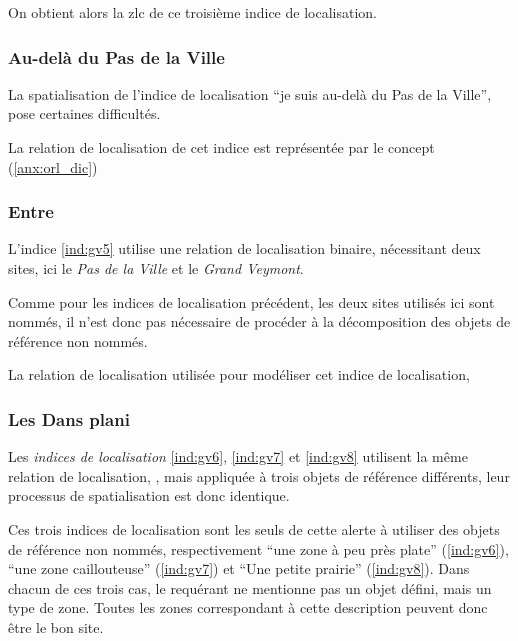 On obtient alors la \ac{zlc} de ce troisième indice de localisation.

%   




\subsubsection{Au-delà du Pas de la Ville}

La spatialisation de l'indice de localisation \enquote{je suis au-delà
  du Pas de la Ville}, pose certaines difficultés.

La relation de localisation de cet indice est représentée par le
concept 
(\autoref{anx:orl_dic})

\subsubsection{Entre}

L'indice \ref{ind:gv5} utilise une relation de localisation binaire,
nécessitant deux sites, ici le \emph{Pas de la Ville} et le
\emph{Grand Veymont}.

Comme pour les indices de localisation précédent, les deux sites
utilisés ici sont nommés, il n'est donc pas nécessaire de procéder à
la décomposition des objets de référence non nommés.

La relation de localisation utilisée pour modéliser cet indice de
localisation,  

\subsubsection{Les Dans plani}

Les \emph{indices de localisation} \ref{ind:gv6}, \ref{ind:gv7} et
\ref{ind:gv8} utilisent la même relation de localisation,
, mais appliquée à trois objets de
référence différents, leur processus de spatialisation est donc
identique.

Ces trois indices de localisation sont les seuls de cette alerte à
utiliser des objets de référence non nommés, respectivement
\enquote{une zone à peu près plate} (\ref{ind:gv6}), \enquote{une zone
  caillouteuse} (\ref{ind:gv7}) et \enquote{Une petite prairie}
(\ref{ind:gv8}). Dans chacun de ces trois cas, le requérant ne
mentionne pas un objet défini, mais un type de zone. Toutes les zones
correspondant à cette description peuvent donc être le bon site.

